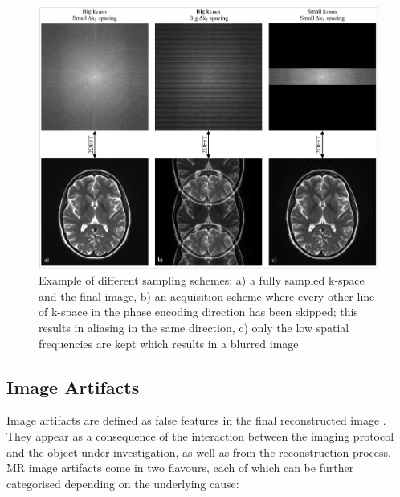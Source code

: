 \begin{figure}[ht]
    \centering
    \includegraphics[width=1\textwidth,keepaspectratio]{images/mri/fourierReconstructionPartial}
    \caption{Example of different sampling schemes: a) a fully sampled k-space and the final image, b) an acquisition scheme where every other line of k-space in the phase encoding direction has been skipped; this results in aliasing in the same direction, c) only the low spatial frequencies are kept which results in a blurred image}
    \label{fig:fourierReconstructionPartial}
\end{figure}

\hfill

\subsection{Image Artifacts}

Image artifacts are defined as false features in the final reconstructed image \cite{Haacke1999}. 
They appear as a consequence of the interaction between the imaging protocol and the object under investigation, as well as from the reconstruction process. 
MR image artifacts come in two flavours, each of which can be further categorised depending on the underlying cause:

\hfill

